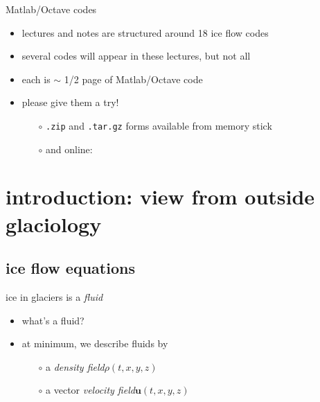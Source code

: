 \begin{frame}{Matlab/Octave codes}

\begin{itemize}
\item lectures and notes are structured around 18 ice flow codes
\item several codes will appear in these lectures, but not all
\item each is $\sim$ 1/2 page of Matlab/Octave code
\item please give them a try!

  \begin{itemize}
  \item[$\circ$] \texttt{.zip} and \texttt{.tar.gz} forms available from memory stick
  \item[$\circ$] and online:

  \bigskip\bigskip\small
  \centerline{}
  
  \end{itemize}
\end{itemize}
\end{frame}


\section[introduction]{introduction: view from outside glaciology}

\subsection{ice flow equations}

\begin{frame}{ice in glaciers is a \emph{fluid}}

\begin{itemize}
\item what's a fluid?

\bigskip\bigskip
\item at minimum, we describe fluids by
  \begin{itemize}
  \item[$\circ$] a \emph{density field}\quad $\rho(t,x,y,z)$
  \item[$\circ$] a vector \emph{velocity field}\quad $\mathbf{u}(t,x,y,z)$
  \end{itemize}
\end{itemize}
\end{frame}

